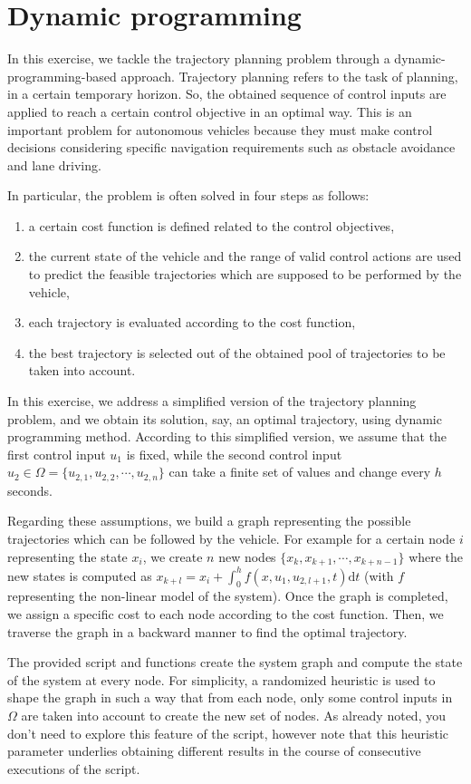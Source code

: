 \setcounter{chapter}{2}
\chapter{Dynamic programming}
	In this exercise, we tackle the trajectory planning problem through a dynamic-programming-based approach.
	Trajectory planning refers to the task of planning, in a certain temporary horizon. So, the obtained sequence of control inputs are applied to reach a certain control objective in an optimal way. 
	This is an important problem for autonomous vehicles because they must make control decisions considering specific navigation requirements such as obstacle avoidance and lane driving.\par
	In particular, the problem is often solved in four steps as follows:
	\begin{enumerate}
		\item a certain cost function is defined related to the control objectives,
		\item the current state of the vehicle and the range of valid control actions are used to predict the feasible trajectories which are supposed to be performed by the vehicle,
		\item each trajectory is evaluated according to the cost function,
		\item the best trajectory is selected out of the obtained pool of trajectories to be taken into account.
	\end{enumerate} 
	In this exercise, we address a simplified version of the trajectory planning problem, and we obtain its solution, say, an optimal trajectory, using dynamic programming method. According to this simplified version, we assume that the first control input $u_1$ is fixed, while the second control input $u_2 \in\Omega = \lbrace u_{2,1}, u_{2,2}, \cdots, u_{2,n} \rbrace$ can take a finite set of values and change every $h$ seconds.\par
	Regarding these assumptions, we build a graph representing the possible trajectories which can be followed by the vehicle.
	For example for a certain node $i$ representing the state $x_i$, we create $n$ new nodes $\lbrace x_k, x_{k+1}, \cdots, x_{k+n-1}\rbrace$ where the new states is computed as $x_{k+l} = x_{i} + \int_0^h f(x,u_1, u_{2, l+1},t) \text{d}t $ (with $f$ representing the non-linear model of the system).
	Once the graph is completed, we assign a specific cost to each node according to the cost function. Then, we traverse the graph in a backward manner to find the optimal trajectory. \par
	The provided script and functions create the system graph and compute the state of the system at every node.
	For simplicity, a randomized heuristic is used to shape the graph in such a way that from each node, only some control inputs in $\Omega$ are taken into account to create the new set of nodes. 
	As already noted, you don't need to explore this feature of the script, however note that this heuristic parameter underlies obtaining different results in the course of consecutive executions of the script.

